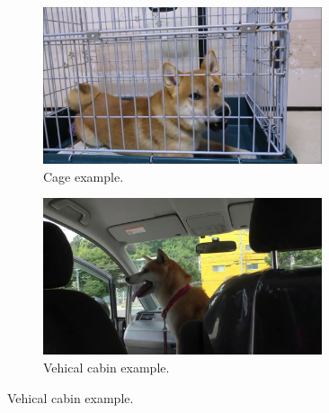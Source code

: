 \documentclass[letterpaper]{article}
\begin{document}
\begin{figure}[h]
\begin{subfigure}[]{0.4\textwidth}
	\centering
	\includegraphics[width=0.9\textwidth]{images/cage.png}
	\caption{Cage example.}
\label{fig:loc3}
\end{subfigure}
\begin{subfigure}[]{0.4\textwidth}
	\centering
	\includegraphics[width=0.9\textwidth]{images/cabin.jpg}
	\caption{Vehical cabin example.}
\label{fig:loc4}
\end{subfigure}


\end{figure}
\end{document}
